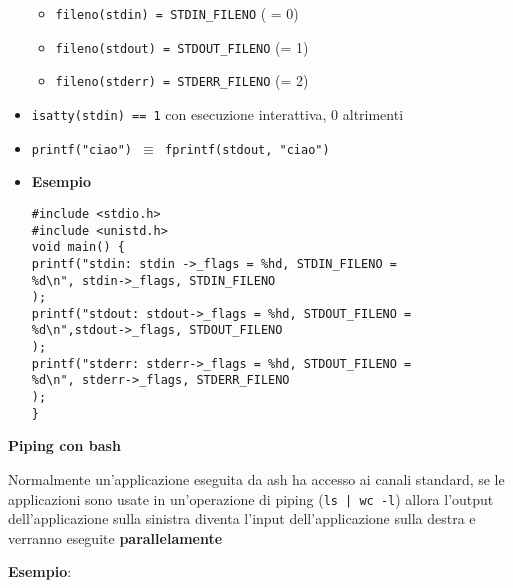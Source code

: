 \begin{flushleft}
\begin{itemize}
          \begin{itemize}
            \item \texttt{fileno(stdin) = STDIN\_FILENO} ( = 0)
            \item \texttt{fileno(stdout) = STDOUT\_FILENO} (= 1)
            \item \texttt{fileno(stderr) = STDERR\_FILENO} (= 2)
          \end{itemize}
    \item \texttt{isatty(stdin) == 1} con esecuzione interattiva, 0 altrimenti 
    \item \texttt{printf("ciao") $\equiv$ fprintf(stdout, "ciao")}
    \item \textbf{Esempio} \\
          \begin{flushleft}
            \texttt{\#include <stdio.h>\\
            \#include <unistd.h>\\
            void main() \{ \\
             \tab printf("stdin: stdin ->\_flags = \%hd, STDIN\_FILENO = \\
             \tab \halftab \%d\textbackslash n", stdin->\_flags, STDIN\_FILENO\\
             \tab ); \\
             \tab printf("stdout: stdout->\_flags = \%hd, STDOUT\_FILENO =\\
             \tab \halftab \%d\textbackslash n",stdout->\_flags, STDOUT\_FILENO \\
             \tab ); \\
             \tab printf("stderr: stderr->\_flags = \%hd, STDOUT\_FILENO = \\
             \tab \halftab \%d\textbackslash n", stderr->\_flags, STDERR\_FILENO\\
             \tab ); \\
             \} }
          \end{flushleft}
  \end{itemize}
  \textbf{Piping con bash}
  \begin{flushleft}
    Normalmente un'applicazione eseguita da ash ha accesso ai canali standard, se le applicazioni sono usate 
    in un'operazione di piping (\texttt{ls | wc -l}) allora l'output  dell'applicazione 
    sulla sinistra diventa l'input dell'applicazione sulla destra e verranno eseguite \textbf{parallelamente} \par 
    \textbf{Esempio}: \\

\end{flushleft}
\end{flushleft}
